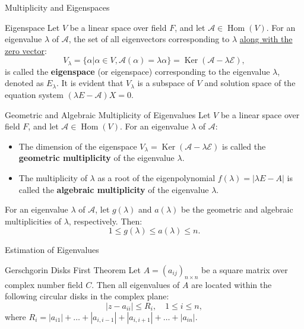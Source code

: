 \documentclass[11pt]{../../TexTemplate/elegantbook} %
\begin{document}
\begin{leftbarTitle}{Multiplicity and Eigenspaces}\end{leftbarTitle}
\begin{definition}{Eigenspace}
    Let \( V \) be a linear space over field \( F \), 
    and let \( \mathcal{A}\in \operatorname{Hom}(V) \).
    For an eigenvalue \( \lambda \) of \( \mathcal{A} \), 
    the set of all eigenvectors corresponding to \( \lambda \) \underline{along with the zero vector}:
    \[
    V_{\lambda} = \{ \alpha | \alpha \in V, \mathcal{A}(\alpha) = \lambda \alpha \} = 
    \operatorname{Ker}(\mathcal{A} - \lambda \mathcal{E}),
    \]
    is called the \textbf{eigenspace} (or eigenspace) corresponding to the eigenvalue \( \lambda \),
    denoted as \( E_{\lambda} \).
    It is evident that \( V_{\lambda} \) is a subspace of \( V \)
    and solution space of the equation system \( ( \lambda E - \mathcal{A})X = 0 \).
\end{definition}

\begin{definition}{Geometric and Algebraic Multiplicity of Eigenvalues}
    Let \( V \) be a linear space over field \( F \), 
    and let \( \mathcal{A}\in \operatorname{Hom}(V) \).
    For an eigenvalue \( \lambda \) of \( \mathcal{A} \):
    \begin{itemize}
        \item The dimension of the eigenspace \( V_{\lambda} = \operatorname{Ker}(\mathcal{A} - \lambda \mathcal{E}) \)
            is called the \textbf{geometric multiplicity} of the eigenvalue \( \lambda \).
        \item The multiplicity of \( \lambda \) as a root of the eigenpolynomial \( f(\lambda) = |\lambda E - A| \)
            is called the \textbf{algebraic multiplicity} of the eigenvalue \( \lambda \).
    \end{itemize}
\end{definition}

\begin{property}
    For an eigenvalue \( \lambda \) of \( \mathcal{A} \),
    let \( g(\lambda) \) and \( a(\lambda) \) be the geometric and algebraic multiplicities of \( \lambda \), respectively.
    Then:
    \[
    1 \leqslant g(\lambda) \leqslant a(\lambda) \leqslant n.
    \]
\end{property}

\begin{leftbarTitle}{Estimation of Eigenvalues}\end{leftbarTitle}
\begin{theorem}{Gerschgorin Disks First Theorem}
    Let \( A = (a_{ij})_{n \times n}\) be a square matrix over complex number field \( C \).
    Then all eigenvalues of \( A \) are located within the following circular disks in the complex plane:
    \[
    |z - a_{ii}| \leq R_i, \quad 1 \leq i \leq n,
    \]
    where \(R_i = |a_{i1}| + \dots + |a_{i,i-1}| + |a_{i,i+1}| + \dots + |a_{in}|\).
\end{theorem}
\end{document}
